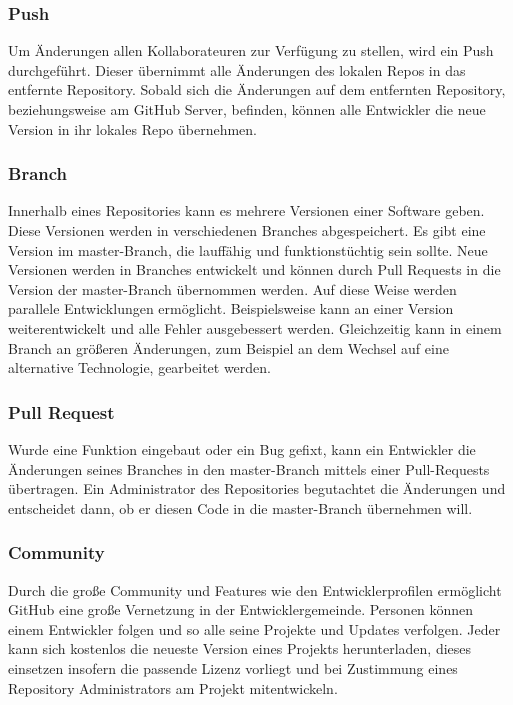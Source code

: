 \documentclass[FIPLY_base.tex]{subfiles}
\begin{document}
\subsubsection{Push}
Um Änderungen allen Kollaborateuren zur Verfügung zu stellen, wird ein Push durchgeführt.
Dieser übernimmt alle Änderungen des lokalen Repos in das entfernte Repository.
Sobald sich die Änderungen auf dem entfernten Repository, beziehungsweise am GitHub Server, befinden, können alle Entwickler die neue Version in ihr lokales Repo übernehmen. 
 
\subsubsection{Branch}
Innerhalb eines Repositories kann es mehrere Versionen einer Software geben. Diese Versionen werden in verschiedenen Branches abgespeichert.
Es gibt eine Version im master-Branch, die lauffähig und funktionstüchtig sein sollte.
Neue Versionen werden in Branches entwickelt und können durch Pull Requests in die Version der master-Branch übernommen werden. 
Auf diese Weise werden parallele Entwicklungen ermöglicht. Beispielsweise kann an einer Version weiterentwickelt und alle Fehler ausgebessert werden.
Gleichzeitig kann in einem Branch an größeren Änderungen, zum Beispiel an dem Wechsel auf eine alternative Technologie, gearbeitet werden.

\subsubsection{Pull Request}
Wurde eine Funktion eingebaut oder ein Bug gefixt, kann ein Entwickler die Änderungen seines Branches in den master-Branch mittels einer Pull-Requests übertragen. 
Ein Administrator des Repositories begutachtet die Änderungen und entscheidet dann, ob er diesen Code in die master-Branch übernehmen will.

\subsubsection{Community}
Durch die große Community und Features wie den Entwicklerprofilen ermöglicht GitHub eine große Vernetzung in der Entwicklergemeinde.
Personen können einem Entwickler folgen und so alle seine Projekte und Updates verfolgen.
Jeder kann sich kostenlos die neueste Version eines Projekts herunterladen, dieses einsetzen insofern die passende Lizenz vorliegt und bei Zustimmung eines Repository Administrators am Projekt mitentwickeln.
\end{document}
